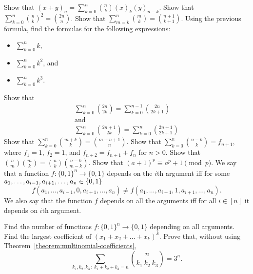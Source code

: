 \begin{chapterendexercises}
  \exercise Show that
    $(x + y)_n = \sum_{k = 0}^n \binom{n}{k} (x)_k (y)_{n - k}$.
  \exercise Show that
    $\sum_{k = 0}^n \binom{n}{k}^2 = \binom{2n}{n}$.
  \exercise Show that $\sum_{m = k}^n \binom{m}{k} =
    \binom{n + 1}{k + 1}$.
  \exercise Using the previous formula, find the formulas for the following
    expressions:
    \begin{itemize}
      \item $\sum_{k = 0}^n k$,
      \item $\sum_{k = 0}^n k^2$, and
      \item $\sum_{k = 0}^n k^3$.
    \end{itemize}
  \exercise Show that
    \begin{gather*}
      \sum_{k = 0}^{n} \binom{2n}{2k} =
      \sum_{k = 0}^{n - 1} \binom{2n}{2k + 1} \\
      \text{and} \\
      \sum_{k = 0}^{n} \binom{2n + 1}{2k} =
      \sum_{k = 0}^n \binom{2n + 1}{2k + 1}
    \end{gather*}
  \exercise[recommended] Show that $\sum_{k = 0}^n \binom{m + k}{k} =
    \binom{m + n + 1}{n}$.
  \exercise Show that $\sum_{k = 0}^n \binom{n - k}{k} = f_{n + 1}$,
    where $f_1 = 1$, $f_2 = 1$, and $f_{n + 2} = f_{n + 1} + f_n$ for $n > 0$.
  \exercise Show that $\binom{n}{m} \binom{m}{k} =
    \binom{n}{k} \binom{n - k}{m - k}$.
  \exercise[recommended] Show that
    $(a + 1)^p \equiv a^p + 1 \pmod{p}$.
  \exercise[recommended] We say that a function $f : \{0, 1\}^n \to \{0, 1\}$ depends on the
    $i$th argument iff for some
    $a_1, \dots, a_{i - 1}, a_{i + 1}, \dots, a_n \in \set{0, 1}$
    \[
      f(a_1, \dots, a_{i - 1}, 0, a_{i + 1}, \dots, a_n) \neq
      f(a_1, \dots, a_{i - 1}, 1, a_{i + 1}, \dots, a_n).
    \]
    We also say that the function $f$ depends on all the arguments iff for all
    $i \in [n]$ it depends on $i$th argument.

    Find the number of functions $f : \{0, 1\}^n \to \{0, 1\}$ depending on all
    arguments.
  \exercise Find the largest coefficient of $(x_1 + x_2 + \dots + x_k)^k$.
  \exercise Prove that,
    without using Theorem~\ref{theorem:multinomial-coefficients},
    \[
      \sum_{k_1, k_2, k_3 ~:~ k_1 + k_2 + k_3 = n} \binom{n}{k_1 \ k_2 \ k_3} =
      3^n.
    \]
\end{chapterendexercises}

